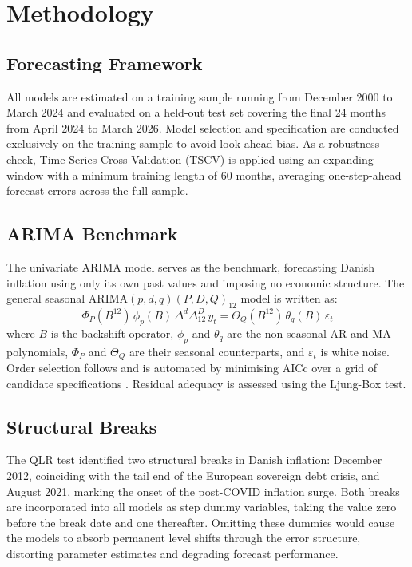\chapter{Methodology}\label{sec:methodology}

\section{Forecasting Framework}

All models are estimated on a training sample running from December 2000 to 
March 2024 and evaluated on a held-out test set covering the final 24 months 
from April 2024 to March 2026. Model selection and specification are conducted 
exclusively on the training sample to avoid look-ahead bias. As a robustness 
check, Time Series Cross-Validation (TSCV) is applied using an expanding window 
with a minimum training length of 60 months, averaging one-step-ahead forecast 
errors across the full sample.

\section{ARIMA Benchmark}

The univariate ARIMA model serves as the benchmark, forecasting Danish inflation 
using only its own past values and imposing no economic structure. The general 
seasonal ARIMA$(p,d,q)(P,D,Q)_{12}$ model is written as:
\[
\Phi_P(B^{12})\,\phi_p(B)\,\Delta^d\Delta^D_{12}\,y_t 
= \Theta_Q(B^{12})\,\theta_q(B)\,\varepsilon_t
\]
where $B$ is the backshift operator, $\phi_p$ and $\theta_q$ are the 
non-seasonal AR and MA polynomials, $\Phi_P$ and $\Theta_Q$ are their seasonal 
counterparts, and $\varepsilon_t$ is white noise. Order selection follows 
\textcite{box_jenkins_1976} and is automated by minimising AICc over a grid of candidate 
specifications \parencite{hyndman_athanasopoulos_2021}. Residual adequacy is assessed using the 
Ljung-Box test.

\section{Structural Breaks}

The QLR test identified two structural breaks in Danish inflation: December 2012, 
coinciding with the tail end of the European sovereign debt crisis, and August 
2021, marking the onset of the post-COVID inflation surge. Both breaks are 
incorporated into all models as step dummy variables, taking the value zero 
before the break date and one thereafter. Omitting these dummies would cause the 
models to absorb permanent level shifts through the error structure, distorting 
parameter estimates and degrading forecast performance.

